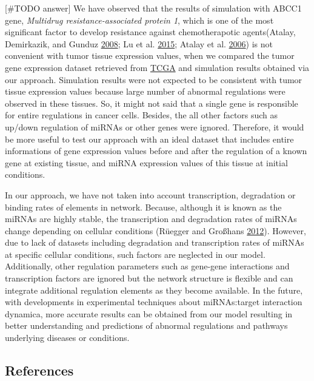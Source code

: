\documentclass[]{article}
\begin{document}
{[}\#TODO answer{]} We have observed that the results of simulation with
ABCC1 gene, \emph{Multidrug resistance-associated protein 1}, which is
one of the most significant factor to develop resistance against
chemotherapotic agents(Atalay, Demirkazik, and Gunduz
\protect\hyperlink{ref-atalay2008role}{2008}; Lu et al.
\protect\hyperlink{ref-lu2015microrna}{2015}; Atalay et al.
\protect\hyperlink{ref-atalay2006multidrug}{2006}) is not convenient
with tumor tissue expression values, when we compared the tumor gene
expression dataset retrieved from
\href{https://www.cancer.gov/about-nci/organization/ccg/research/structural-genomics/tcga}{TCGA}
and simulation results obtained via our approach. Simulation results
were not expected to be consistent with tumor tissue expression values
because large number of abnormal regulations were observed in these
tissues. So, it might not said that a single gene is responsible for
entire regulations in cancer cells. Besides, the all other factors such
as up/down regulation of miRNAs or other genes were ignored. Therefore,
it would be more useful to test our approach with an ideal dataset that
includes entire informations of gene expression values before and after
the regulation of a known gene at existing tissue, and miRNA expression
values of this tissue at initial conditions.

In our approach, we have not taken into account transcription,
degradation or binding rates of elements in network. Because, although
it is known as the miRNAs are highly stable, the transcription and
degradation rates of miRNAs change depending on cellular conditions
(Rüegger and Großhans
\protect\hyperlink{ref-ruegger_microrna_2012}{2012}). However, due to
lack of datasets including degradation and transcription rates of miRNAs
at specific cellular conditions, such factors are neglected in our
model. Additionally, other regulation parameters such as gene-gene
interactions and transcription factors are ignored but the network
structure is flexible and can integrate additional regulation elements
as they become available. In the future, with developments in
experimental techniques about miRNAs:target interaction dynamica, more
accurate results can be obtained from our model resulting in better
understanding and predictions of abnormal regulations and pathways
underlying diseases or conditions.

\hypertarget{references}{%
\subsection*{References}\label{references}}
\end{document}
